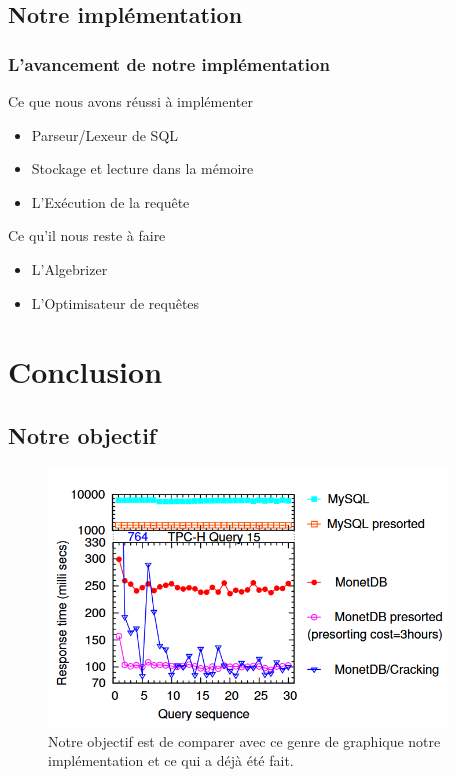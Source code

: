 \documentclass[a4paper,12pt]{beamer}
\begin{document}
\subsection{Notre implémentation}
\begin{frame}
    \frametitle{L'avancement de notre implémentation}
    \begin{block}{Ce que nous avons réussi à implémenter}
    \begin{itemize}
        \item  Parseur/Lexeur de SQL
        \item  Stockage et lecture dans la mémoire
        \item  L'Exécution de la requête
    \end{itemize}
    \end{block}
    \begin{block}{Ce qu'il nous reste à faire}
    \begin{itemize}
        \item  L'Algebrizer
        \item  L'Optimisateur de requêtes
    \end{itemize}
    \end{block}
\end{frame}


\section{Conclusion}
\subsection{Notre objectif}

\begin{frame}
	\begin{figure}[h]
		\centering
		\includegraphics[width=300pt]{ressource/perf_comparaison.png}
    \caption{Notre objectif est de comparer avec ce genre de graphique notre implémentation et ce qui a déjà été fait.}
	\end{figure}
\end{frame}
\end{document}
